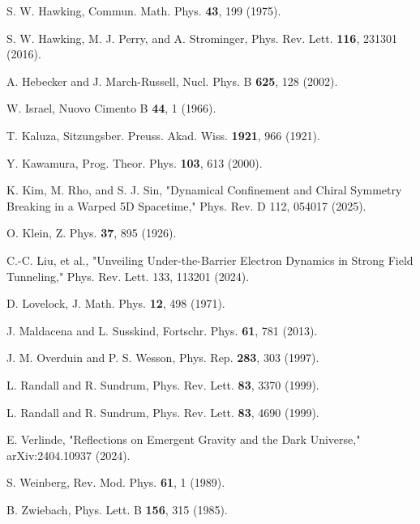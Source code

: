 \documentclass[aps,prd,onecolumn,10pt,superscriptaddress,nofootinbib,floatfix]{revtex4-2}
\begin{document}
\begin{thebibliography}{99}
S. W. Hawking, Commun. Math. Phys. \textbf{43}, 199 (1975).

S. W. Hawking, M. J. Perry, and A. Strominger, Phys. Rev. Lett. \textbf{116}, 231301 (2016).

A. Hebecker and J. March-Russell, Nucl. Phys. B \textbf{625}, 128 (2002).

W. Israel, Nuovo Cimento B \textbf{44}, 1 (1966).

T. Kaluza, Sitzungsber. Preuss. Akad. Wiss. \textbf{1921}, 966 (1921).

Y. Kawamura, Prog. Theor. Phys. \textbf{103}, 613 (2000).

K. Kim, M. Rho, and S. J. Sin, "Dynamical Confinement and Chiral Symmetry Breaking in a Warped 5D Spacetime," Phys. Rev. D 112, 054017 (2025).

O. Klein, Z. Phys. \textbf{37}, 895 (1926).

C.-C. Liu, et al., "Unveiling Under-the-Barrier Electron Dynamics in Strong Field Tunneling," Phys. Rev. Lett. 133, 113201 (2024).

D. Lovelock, J. Math. Phys. \textbf{12}, 498 (1971).

J. Maldacena and L. Susskind, Fortschr. Phys. \textbf{61}, 781 (2013).

J. M. Overduin and P. S. Wesson, Phys. Rep. \textbf{283}, 303 (1997).

L. Randall and R. Sundrum, Phys. Rev. Lett. \textbf{83}, 3370 (1999).

L. Randall and R. Sundrum, Phys. Rev. Lett. \textbf{83}, 4690 (1999).

E. Verlinde, "Reflections on Emergent Gravity and the Dark Universe," arXiv:2404.10937 (2024).

S. Weinberg, Rev. Mod. Phys. \textbf{61}, 1 (1989).

B. Zwiebach, Phys. Lett. B \textbf{156}, 315 (1985).

\end{thebibliography}
\end{document}
